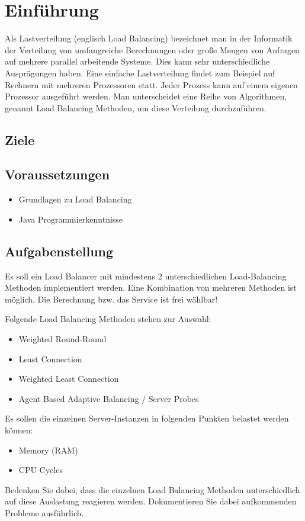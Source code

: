 
\section{Einführung}
Als Lastverteilung (englisch Load Balancing) bezeichnet man in der Informatik der Verteilung von umfangreiche Berechnungen oder große Mengen von Anfragen auf mehrere parallel arbeitende Systeme. Dies kann sehr unterschiedliche Ausprägungen haben. Eine einfache Lastverteilung findet zum Beispiel auf Rechnern mit mehreren Prozessoren statt. Jeder Prozess kann auf einem eigenen Prozessor ausgeführt werden. Man unterscheidet eine Reihe von Algorithmen, genannt Load Balancing Methoden, um diese Verteilung durchzuführen.

\subsection{Ziele}



\subsection{Voraussetzungen}
\begin{itemize}
	\item Grundlagen zu Load Balancing
	\item Java Programmierkenntnisse
\end{itemize}


\subsection{Aufgabenstellung}
Es soll ein Load Balancer mit mindestens 2 unterschiedlichen Load-Balancing Methoden implementiert werden. Eine Kombination von mehreren Methoden ist möglich. Die Berechnung bzw. das Service ist frei wählbar!

Folgende Load Balancing Methoden stehen zur Auswahl:

\begin{itemize}
	\item Weighted Round-Round
	\item Least Connection
	\item Weighted Least Connection
	\item Agent Based Adaptive Balancing / Server Probes
\end{itemize}

Es sollen die einzelnen Server-Instanzen in folgenden Punkten belastet werden können:
\begin{itemize}
	\item Memory (RAM)
	\item CPU Cycles
\end{itemize}

Bedenken Sie dabei, dass die einzelnen Load Balancing Methoden unterschiedlich auf diese Auslastung reagieren werden. Dokumentieren Sie dabei aufkommenden Probleme ausführlich.
\clearpage


